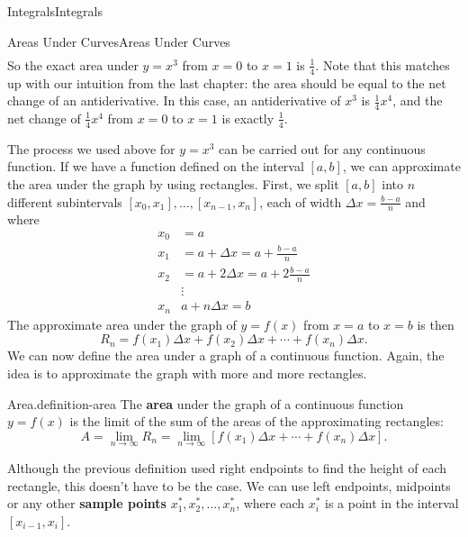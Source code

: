 \documentclass[10pt,]{book}
\newcommand{\terminology}[1]{\textbf{#1}}
\numberwithin{equation}{section}
\begin{document}
\begin{chapterptx}{Integrals}{}{Integrals}{}{}
\begin{sectionptx}{Areas Under Curves}{}{Areas Under Curves}{}{}
\begin{align*}
\end{align*}
So the exact area under \(y = x^{3}\) from \(x=0\) to \(x=1\) is \(\frac{1}{4}\). Note that this matches up with our intuition from the last chapter: the area should be equal to the net change of an antiderivative. In this case, an antiderivative of \(x^{3}\) is \(\frac{1}{4}x^{4}\), and the net change of \(\frac{1}{4}x^{4}\) from \(x=0\) to \(x=1\) is exactly \(\frac{1}{4}\).%
\par
\hypertarget{p-407}{}%
The process we used above for \(y = x^{3}\) can be carried out for any continuous function. If we have a function defined on the interval \([a,b]\), we can approximate the area under the graph by using rectangles. First, we split \([a,b]\) into \(n\) different subintervals \([x_{0},x_{1}],\ldots,[x_{n-1},x_{n}]\), each of width \(\Delta x = \frac{b-a}{n}\) and where%
\begin{align*}
x_{0} & = a \\
x_{1} & = a + \Delta x = a+\frac{b-a}{n} \\
x_{2} & = a + 2\Delta x = a + 2\frac{b-a}{n}\\
& \vdots \\
x_{n} & a+n\Delta x = b
\end{align*}
The approximate area under the graph of \(y=f(x)\) from \(x=a\) to \(x=b\) is then%
\begin{equation*}
R_{n} = f(x_{1})\Delta x + f(x_{2})\Delta x + \cdots + f(x_{n})\Delta x.
\end{equation*}
We can now define the area under a graph of a continuous function. Again, the idea is to approximate the graph with more and more rectangles.%
\begin{definition}{Area.}{definition-area}%
\hypertarget{p-408}{}%
The \terminology{area} under the graph of a continuous function \(y=f(x)\) is the limit of the sum of the areas of the approximating rectangles:%
\begin{equation*}
A = \lim_{n\to\infty}R_{n} = \lim_{n\to\infty}[f(x_{1})\Delta x + \cdots + f(x_{n})\Delta x].
\end{equation*}
%
\end{definition}
\hypertarget{p-409}{}%
Although the previous definition used right endpoints to find the height of each rectangle, this doesn't have to be the case. We can use left endpoints, midpoints or any other \terminology{sample points} \(x_{1}^{*}, x_{2}^{*},\ldots,x_{n}^{*}\), where each \(x_{i}^{*}\) is a point in the interval \([x_{i-1},x_{i}].\)%
\par

\end{sectionptx}
\end{chapterptx}
\end{document}
